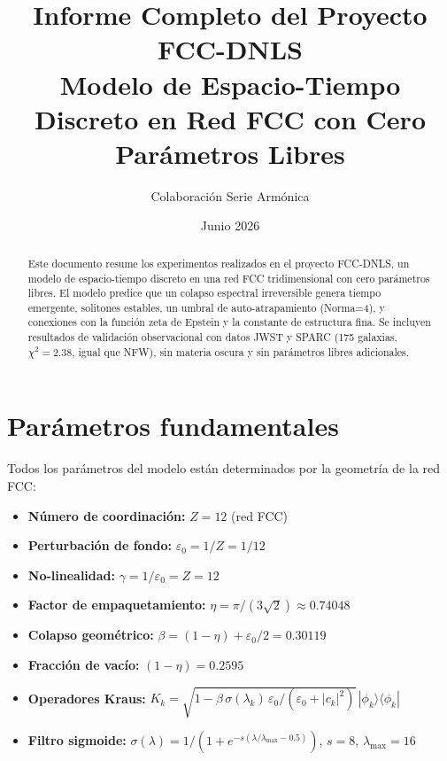 \documentclass[12pt]{article}
\begin{document}
\title{\textbf{Informe Completo del Proyecto FCC-DNLS}\\Modelo de Espacio-Tiempo Discreto en Red FCC con Cero Par\'ametros Libres}
\author{Colaboraci\'on Serie Arm\'onica}
\date{Junio 2026}

\maketitle

\begin{abstract}
Este documento resume los experimentos realizados en el proyecto FCC-DNLS, un modelo de espacio-tiempo discreto en una red FCC tridimensional con cero par\'ametros libres. El modelo predice que un colapso espectral irreversible genera tiempo emergente, solitones estables, un umbral de auto-atrapamiento (Norma=4), y conexiones con la funci\'on zeta de Epstein y la constante de estructura fina. Se incluyen resultados de validaci\'on observacional con datos JWST y SPARC (175 galaxias, $\chi^2 = 2.38$, igual que NFW), sin materia oscura y sin par\'ametros libres adicionales.
\end{abstract}

\section{Par\'ametros fundamentales}

Todos los par\'ametros del modelo est\'an determinados por la geometr\'ia de la red FCC:

\begin{itemize}
  \item \textbf{N\'umero de coordinaci\'on:} $Z = 12$ (red FCC)
  \item \textbf{Perturbaci\'on de fondo:} $\varepsilon_0 = 1/Z = 1/12$
  \item \textbf{No-linealidad:} $\gamma = 1/\varepsilon_0 = Z = 12$
  \item \textbf{Factor de empaquetamiento:} $\eta = \pi/(3\sqrt{2}) \approx 0.74048$
  \item \textbf{Colapso geom\'etrico:} $\beta = (1-\eta) + \varepsilon_0/2 = 0.30119$
  \item \textbf{Fracci\'on de vac\'io:} $(1-\eta) = 0.2595$
  \item \textbf{Operadores Kraus:} $K_k = \sqrt{1-\beta\,\sigma(\lambda_k)\,\varepsilon_0/(\varepsilon_0+|c_k|^2)}\,|\phi_k\rangle\langle\phi_k|$
  \item \textbf{Filtro sigmoide:} $\sigma(\lambda) = 1/(1+e^{-s(\lambda/\lambda_{\max}-0.5)})$, $s=8$, $\lambda_{\max}=16$
\end{itemize}
\end{document}
